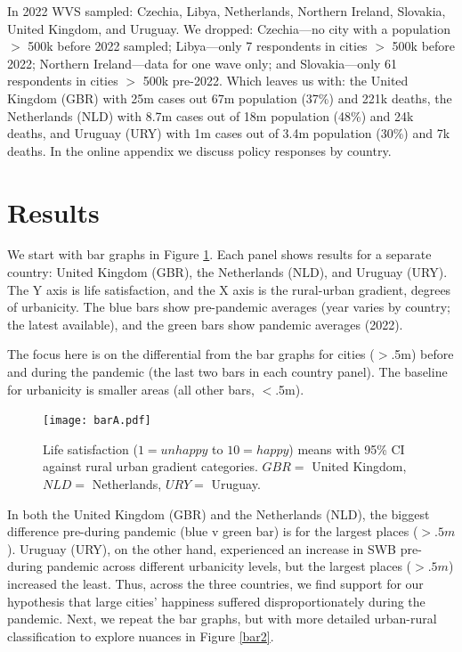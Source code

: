 \documentclass[10pt, letterpaper]{article}
\begin{document}
\begin{spacing}{1.4}
In 2022 WVS sampled: Czechia, Libya, Netherlands, Northern Ireland, Slovakia, United
Kingdom, and Uruguay. We dropped: Czechia---no city with a population $>$ 500k before 2022
 sampled; Libya---only 7 respondents in cities $>$ 500k before 2022; Northern
Ireland---data for one wave only; and Slovakia---only 61 respondents in cities $>$ 500k pre-2022. Which leaves us with: the United Kingdom (GBR) with 25m cases out 67m
population (37\%) and 221k deaths, the Netherlands (NLD) with 8.7m cases out of
18m population (48\%) and  24k deaths, and Uruguay (URY) with 1m cases out of
3.4m population (30\%) and 7k deaths. In the online appendix we discuss policy
responses by country. 

\section{Results}

We start with bar graphs in Figure \ref{barA}. Each panel shows results for a
separate country: United Kingdom (GBR), the Netherlands (NLD), and Uruguay
(URY). The Y axis is life satisfaction, and the X axis is the rural-urban
gradient, degrees of urbanicity. The blue bars show pre-pandemic averages (year varies by country; the latest available), and the green bars show pandemic averages (2022). 

The focus here is on the differential from the bar graphs for cities ($>$.5m) before and
 during the pandemic (the last two bars in each country panel). The baseline for
 urbanicity is smaller areas (all other bars, $<$.5m).  


\begin{figure}[H]
 \texttt{[image: barA.pdf]}\centering
\caption{\label{barA}Life satisfaction ($1=unhappy$ to $10=happy$) means with 95\% CI against rural urban gradient categories. $GBR=$ United Kingdom, $NLD=$ Netherlands, $URY=$ Uruguay.}
 \end{figure}

In both the United Kingdom (GBR) and the Netherlands (NLD), the biggest difference
pre-during pandemic (blue v green bar) is for the largest places ($>.5m$). Uruguay
(URY), on the other hand, experienced an increase in SWB pre-during pandemic across different urbanicity levels, but the largest places ($>.5m$) increased the least. Thus, across the three countries, we find support for our hypothesis that large cities' happiness suffered
disproportionately during the pandemic. Next, we repeat the bar graphs, but with more detailed urban-rural classification to explore nuances in Figure \ref{bar2}.


\end{spacing}
\end{document}
